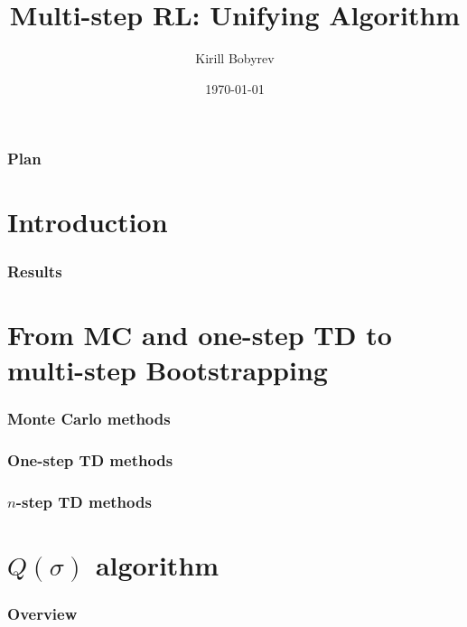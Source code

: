 \documentclass{beamer}
\title{Multi-step RL: Unifying Algorithm}
\author{Kirill Bobyrev}
\date{\today}
\begin{document}
\begin{frame}
  \titlepage
\end{frame}

\begin{frame}
  \frametitle{Plan}
  \tableofcontents
\end{frame}


\section{Introduction}

\begin{frame}
  \frametitle{Results}
\end{frame}

\section{From MC and one-step TD to multi-step Bootstrapping}

\begin{frame}
  \frametitle{Monte Carlo methods}
\end{frame}

\begin{frame}
  \frametitle{One-step TD methods}
\end{frame}

\begin{frame}
  \frametitle{$n$-step TD methods}
\end{frame}

\section{$Q(\sigma)$ algorithm}

\begin{frame}
  \frametitle{Overview}
\end{frame}
\end{document}
